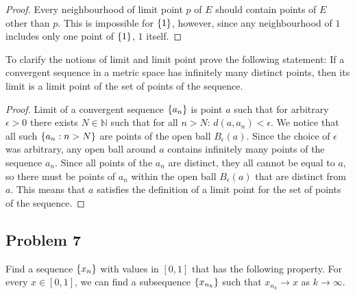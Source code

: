 \documentclass{article}
\newcommand{\N}{\mathbb{N}}
\DeclarePairedDelimiter{\set}{ \{ }{ \} }
\begin{document}
\begin{proof}

Every neighbourhood of limit point $p$ of $E$ should contain points of $E$ other than $p$.
This is impossible for $\set{1}$, however, since any neighbourhood of $1$ includes only one point of $\set{1}$, $1$ itself.

\end{proof}

\begin{tcolorbox}
To clarify the notions of limit and limit point prove the following statement:
If a convergent sequence in a metric space has infinitely many distinct points, then its limit is a limit point of the set of points of the sequence.
\end{tcolorbox}

\begin{proof}

Limit of a convergent sequence $\set{ a_n }$ is point $a$ such that for arbitrary $\epsilon > 0$ there exists $N \in \N$ such that for all $n > N$: $d(a, a_n) < \epsilon$.
We notice that all such $\set{ a_n : n > N }$ are points of the open ball $B_\epsilon(a)$.
Since the choice of $\epsilon$ was arbitrary, any open ball around $a$ contains infinitely many points of the sequence $a_n$.
Since all points of the $a_n$ are distinct, they all cannot be equal to $a$, so there must be points of $a_n$ within the open ball $B_\epsilon(a)$ that are distinct from $a$.
This means that $a$ satisfies the definition of a limit point for the set of points of the sequence.

\end{proof}


\subsection*{Problem 7}

\begin{tcolorbox}
Find a sequence $\set{ x_n }$ with values in $[0, 1]$ that has the following property.
For every $x \in [0, 1]$, we can find a subsequence $\set{ x_{n_k} }$ such that $x_{n_k} \to x$ as $k \to \infty$.
\end{tcolorbox}
\end{document}

